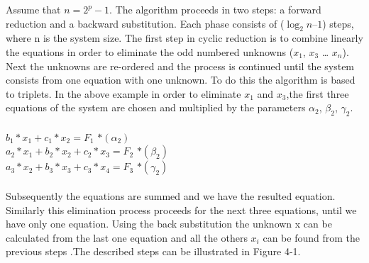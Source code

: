 Assume that $n= 2^p - 1$. 
The algorithm proceeds in two steps: a forward reduction and a backward substitution. Each phase consists of ($\log_2n – 1$) steps, where n is the system size. The first step in cyclic reduction is to combine linearly the equations in order to eliminate the odd numbered unknowns ($x_1$, $x_3$ … $x_n$). Next the unknowns are re-ordered and the process is continued until the system consists from one equation with one unknown. To do this the algorithm is based to triplets. In the above example in order to eliminate $x_1$ and $x_3$,the first three equations of the system are chosen and multiplied by the parameters $\alpha_2$, $\beta_2$, $\gamma_2$. \\
\\
$b_1*x_1+c_1*x_2= F_1$                        \hspace*{5cm} $*(\alpha_2)$	\\
$a_2*x_1+ b_2*x_2+c_2*x_3= F_2$               \hspace*{3,3cm} $* (\beta_2)$  \\
\hspace*{2cm}$a_3*x_2+ b_3*x_3+c_3*x_4= F_3$  \hspace*{1,3cm} $*(\gamma_2)$     \\ \\
Subsequently the equations are summed and we have the resulted equation. Similarly this elimination process proceeds for the next three equations, until we have only one equation.
Using the back substitution the unknown x can be calculated from the last one equation and  all the others $x_i$ can be found  from the previous steps .The described steps can be illustrated in Figure 4-1.\\


